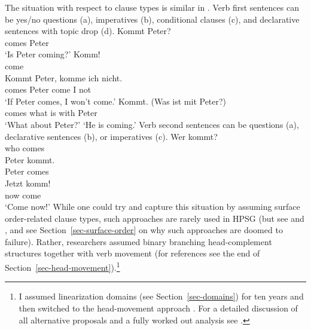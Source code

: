 \documentclass[output=paper
	        ,collection
	        ,collectionchapter
 	        ,biblatex
                ,babelshorthands
                ,newtxmath
                ,draftmode
                ,colorlinks, citecolor=brown
]{langscibook}
\begin{document}
The situation with respect to clause types is similar in . Verb first sentences can be yes/no
questions (a), imperatives (b), conditional clauses (c), and declarative
sentences with topic drop (d). 
\eal
\ex\label{ex-kommt-peter-question}
\gll Kommt Peter?\\
     comes Peter\\\german
\glt `Is Peter coming?'
\ex 
\gll Komm!\\
     come\\
\ex\label{ex-kommt-peter-conditional}
\gll Kommt Peter, komme ich nicht.\\
     comes Peter  come  I not\\
\glt `If Peter comes, I won't come.'
\ex 
\gll Kommt. (Was ist mit Peter?)\\
     comes  what is with Peter\\
\glt `What about Peter?' `He is coming.'
\zl
Verb second sentences can be questions (a), declarative sentences (b), or imperatives (c).
\eal
\ex 
\gll Wer kommt?\\
     who comes\\\german
\ex 
\gll Peter kommt.\\
     Peter comes\\
\ex 
\gll Jetzt komm!\\
     now   come\\
\glt `Come now!'
\zl
While one could try and capture this situation by assuming surface order-related clause types, such approaches are rarely
used in HPSG (but see  and , and see Section~\ref{sec-surface-order} on why such approaches
are doomed to failure). Rather, researchers assumed binary branching head-complement structures
together with verb movement (for references see the end of
Section~\ref{sec-head-movement}).\footnote{%
I assumed linearization domains (see Section~\ref{sec-domains}) for ten
years and then switched to the head-movement approach
\citep{Mueller2005c,Mueller2005d,MuellerGS}. For a detailed discussion of all alternative proposals
and a fully worked out analysis see .%
} 
\end{document}
